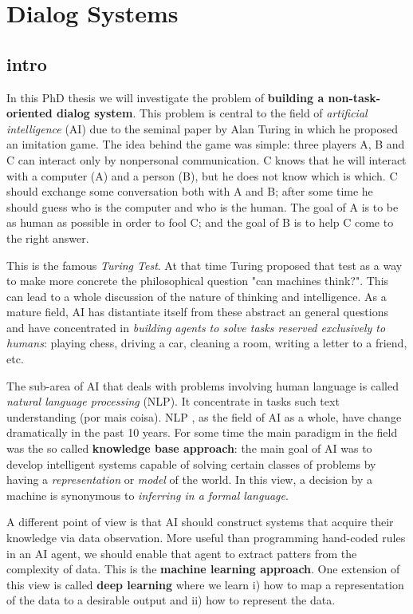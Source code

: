 \chapter{Dialog Systems}\label{dialog}
\section{intro}\label{sec:intro}

In this PhD thesis we will investigate the problem of \textbf{building a non-task-oriented dialog system}. This problem is central to the field of \textit{artificial intelligence} (AI) due to the seminal paper by Alan Turing \cite{Turing} in which he proposed an imitation game. The idea behind the game was simple: three players A, B and C can interact only by nonpersonal communication. C knows that he will interact with a computer (A) and a person (B), but he does not know which is which. C should exchange some conversation both with A and B; after some time he should guess who is the computer and who is the human. The goal of A is to be as human as possible in order to fool C; and the goal of B is to help C come to the right answer.

\par This is the famous \textit{Turing Test}. At that time Turing proposed that test as a way to make more concrete the philosophical question "can machines think?". This can lead to a whole discussion of the nature of thinking and intelligence. As a mature field, AI has distantiate itself from these abstract an general questions and have concentrated in \textit{building agents to solve tasks reserved exclusively to humans}: playing chess, driving a car, cleaning a room, writing a letter to a friend, etc.    

\par The sub-area of AI that deals with problems involving human language is called \textit{natural language processing} (NLP). It concentrate in tasks such text understanding (por mais coisa). NLP , as the field of AI as a whole, have change dramatically in the past 10 years. For some time the main paradigm in the field was the so called \textbf{knowledge base approach}: the main goal of AI was to develop intelligent systems capable of solving certain classes of problems by having a \textit{representation} or \textit{model} of the world. In this view, a decision by a machine is synonymous to \textit{inferring in a formal language}\cite{McCarthy}.


\par A different point of view is that AI should construct systems that acquire their knowledge via data observation. 
More useful than programming hand-coded rules in an AI agent, we should enable that agent to extract patters from the complexity of data. This is the \textbf{machine learning approach}. One extension of this view is called \textbf{deep learning} where we learn i) how to map a representation of the data to a desirable output and ii) how to represent the data.

